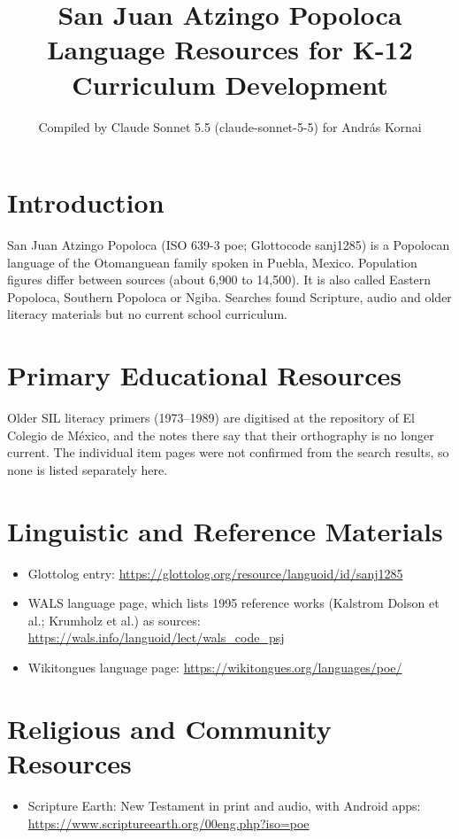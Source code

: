 \documentclass[12pt]{article}
\title{San Juan Atzingo Popoloca Language Resources for K-12 Curriculum Development}
\author{Compiled by Claude Sonnet 5.5 (claude-sonnet-5-5) for Andr\'as Kornai}
\date{}
\begin{document}
\maketitle

\section{Introduction}
San Juan Atzingo Popoloca (ISO 639-3 poe; Glottocode sanj1285) is a Popolocan language of the Otomanguean family spoken in Puebla, Mexico. Population figures differ between sources (about 6,900 to 14,500). It is also called Eastern Popoloca, Southern Popoloca or Ngiba. Searches found Scripture, audio and older literacy materials but no current school curriculum.

\section{Primary Educational Resources}
Older SIL literacy primers (1973--1989) are digitised at the repository of El Colegio de M\'exico, and the notes there say that their orthography is no longer current. The individual item pages were not confirmed from the search results, so none is listed separately here.

\section{Linguistic and Reference Materials}
\begin{itemize}
\item Glottolog entry: \url{https://glottolog.org/resource/languoid/id/sanj1285}
\item WALS language page, which lists 1995 reference works (Kalstrom Dolson et al.; Krumholz et al.) as sources: \url{https://wals.info/languoid/lect/wals_code_psj}
\item Wikitongues language page: \url{https://wikitongues.org/languages/poe/}
\end{itemize}

\section{Religious and Community Resources}
\begin{itemize}
\item Scripture Earth: New Testament in print and audio, with Android apps: \url{https://www.scriptureearth.org/00eng.php?iso=poe}
\end{itemize}
\end{document}
